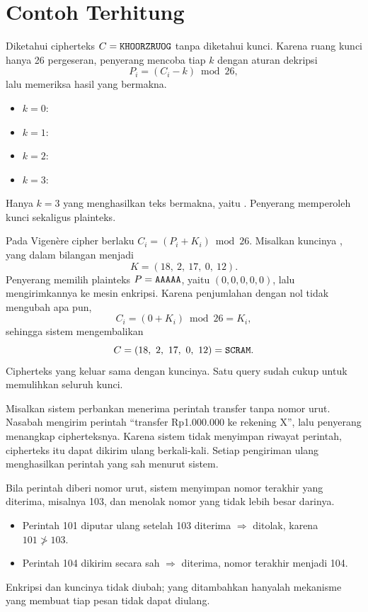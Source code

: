 \section{Contoh Terhitung}

\begin{example}
Diketahui cipherteks $C = \texttt{KHOORZRUOG}$ tanpa diketahui kunci. Karena ruang
kunci hanya 26 pergeseran, penyerang mencoba tiap $k$ dengan aturan dekripsi
\[ P_i = (C_i - k) \bmod 26, \]
lalu memeriksa hasil yang bermakna.
\begin{itemize}
    \item $k=0$: 
    \item $k=1$: 
    \item $k=2$: 
    \item $k=3$: 
\end{itemize}
Hanya $k=3$ yang menghasilkan teks bermakna, yaitu . Penyerang
memperoleh kunci sekaligus plainteks.
\end{example}

\begin{example}
Pada Vigen\`ere cipher berlaku $C_i = (P_i + K_i) \bmod 26$. Misalkan kuncinya
, yang dalam bilangan menjadi
\[ K = (18,\ 2,\ 17,\ 0,\ 12). \]
Penyerang memilih plainteks $P = \texttt{AAAAA}$, yaitu $(0,0,0,0,0)$, lalu
mengirimkannya ke mesin enkripsi. Karena penjumlahan dengan nol tidak mengubah
apa pun,
\[ C_i = (0 + K_i) \bmod 26 = K_i, \]
sehingga sistem mengembalikan
\[ C = (18,\ 2,\ 17,\ 0,\ 12) = \code{SCRAM}. \]
Cipherteks yang keluar sama dengan kuncinya. Satu query sudah cukup untuk
memulihkan seluruh kunci.
\end{example}

\begin{example}
Misalkan sistem perbankan menerima perintah transfer tanpa nomor urut. Nasabah
mengirim perintah ``transfer Rp1.000.000 ke rekening X'', lalu penyerang
menangkap cipherteksnya. Karena sistem tidak menyimpan riwayat perintah,
cipherteks itu dapat dikirim ulang berkali-kali. Setiap pengiriman ulang
menghasilkan perintah yang sah menurut sistem.

Bila perintah diberi nomor urut, sistem menyimpan nomor terakhir yang diterima,
misalnya 103, dan menolak nomor yang tidak lebih besar darinya.
\begin{itemize}
    \item Perintah 101 diputar ulang setelah 103 diterima $\Rightarrow$ ditolak,
          karena $101 \not> 103$.
    \item Perintah 104 dikirim secara sah $\Rightarrow$ diterima, nomor terakhir
          menjadi 104.
\end{itemize}
Enkripsi dan kuncinya tidak diubah; yang ditambahkan hanyalah mekanisme yang
membuat tiap pesan tidak dapat diulang.
\end{example}
